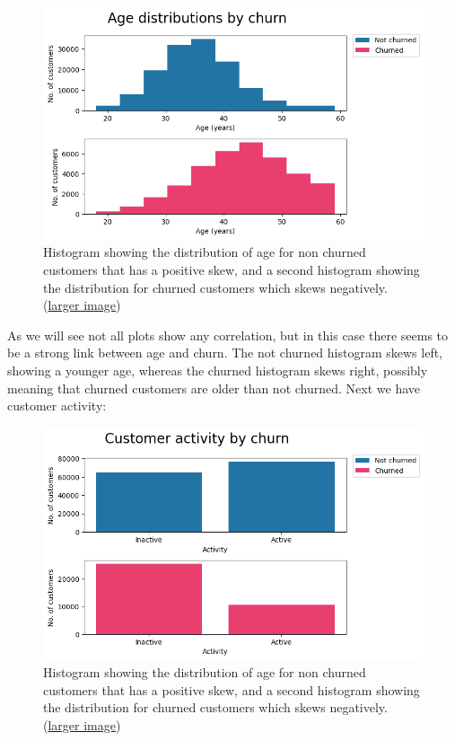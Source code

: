 \documentclass[]{article}
\begin{document}
\begin{figure}[h!]
	\centering
	\includegraphics[scale=0.4]{age_by_churn}
	\caption{Histogram showing the distribution of age for non churned customers that has a positive skew, and a second histogram showing the distribution for churned customers which skews negatively. (\href{https://github.com/ray33ee/Understanding-predicting-and-preventing-churn/blob/main/tex/age_by_churn.png?raw=true}{larger image})}
\end{figure}

As we will see not all plots show any correlation, but in this case there seems to be a strong link between age and churn. The not churned histogram skews left, showing a younger age, whereas the churned histogram skews right, possibly meaning that churned customers are older than not churned. Next we have customer activity:

\clearpage

\begin{figure}[h!]
	\centering
	\includegraphics[scale=0.5]{activity_by_churn}
	\caption{Histogram showing the distribution of age for non churned customers that has a positive skew, and a second histogram showing the distribution for churned customers which skews negatively. (\href{https://github.com/ray33ee/Understanding-predicting-and-preventing-churn/blob/main/tex/activity_by_churn.png?raw=true}{larger image})}
\end{figure}
\end{document}
